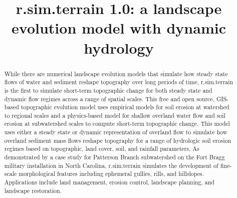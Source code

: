 \documentclass[gmd, manuscript]{copernicus}
\begin{document}
\title{\lowercase{r.sim.terrain 1.0}: a landscape evolution model with dynamic hydrology} 






\received{}
\pubdiscuss{}
\revised{}
\accepted{}
\published{}


\maketitle

\begin{abstract}
While there are numerical landscape evolution models
that simulate how steady state flows of water and sediment
reshape topography over long periods of time, 
r.sim.terrain is the first to 
simulate short-term topographic change 
for both steady state and dynamic flow regimes
across a range of spatial scales.
This free and open source, 
GIS-based topographic evolution model
uses empirical models for soil erosion
at watershed to regional scales 
and a physics-based model
for shallow overland water flow and soil erosion 
at subwatershed scales
to compute short-term topographic change. 
This model uses either a steady state or dynamic representation of overland flow
to simulate how overland sediment mass flows reshape topography
for a range of hydrologic soil erosion regimes
based on topographic, land cover, soil, and rainfall parameters. 
As demonstrated by a case study 
for Patterson Branch subwatershed
on the Fort Bragg military installation in North Carolina,
r.sim.terrain simulates the development of 
fine-scale morphological features including 
ephemeral gullies, rills, and hillslopes.
Applications include land management, erosion control,
landscape planning, and landscape restoration. 
\end{abstract}
\end{document}
